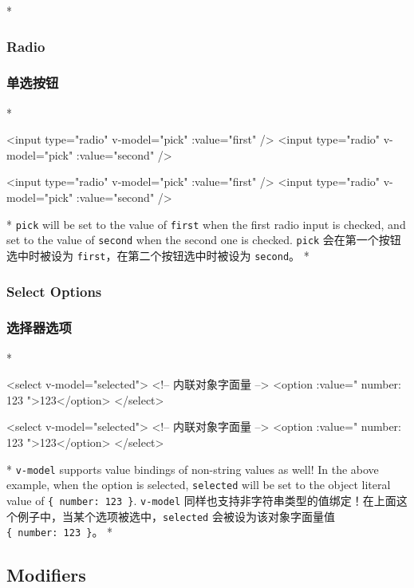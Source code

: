 \begin{paracol}{2}
\switchcolumn[0]*%
\subsubsection{Radio}
\switchcolumn
\subsubsection{单选按钮}
\switchcolumn[0]*%
\begin{codeHtml}
<input type="radio" v-model="pick" :value="first" />
<input type="radio" v-model="pick" :value="second" />
\end{codeHtml}
\switchcolumn
\begin{codeHtml}
<input type="radio" v-model="pick" :value="first" />
<input type="radio" v-model="pick" :value="second" />
\end{codeHtml}
\switchcolumn[0]*%
\texttt{pick} will be set to the value of \texttt{first} when the first
radio input is checked, and set to the value of \texttt{second} when the
second one is checked.
\switchcolumn
\texttt{pick} 会在第一个按钮选中时被设为
\texttt{first}，在第二个按钮选中时被设为 \texttt{second}。
\switchcolumn[0]*%
\subsubsection{Select Options}
\switchcolumn
\subsubsection{选择器选项}
\switchcolumn[0]*%
\begin{codeHtml}
<select v-model="selected">
  <!-- 内联对象字面量 -->
  <option :value="{ number: 123 }">123</option>
</select>
\end{codeHtml}
\switchcolumn
\begin{codeHtml}
<select v-model="selected">
  <!-- 内联对象字面量 -->
  <option :value="{ number: 123 }">123</option>
</select>
\end{codeHtml}


\switchcolumn[0]*%
\texttt{v-model} supports value bindings of non-string values as well!
In the above example, when the option is selected, \texttt{selected}
will be set to the object literal value of
\texttt{\{\ number:\ 123\ \}}.
\switchcolumn
\texttt{v-model}
同样也支持非字符串类型的值绑定！在上面这个例子中，当某个选项被选中，\texttt{selected}
会被设为该对象字面量值 \texttt{\{\ number:\ 123\ \}}。
\switchcolumn[0]*%
\subsection{Modifiers}
\switchcolumn

\end{paracol}
